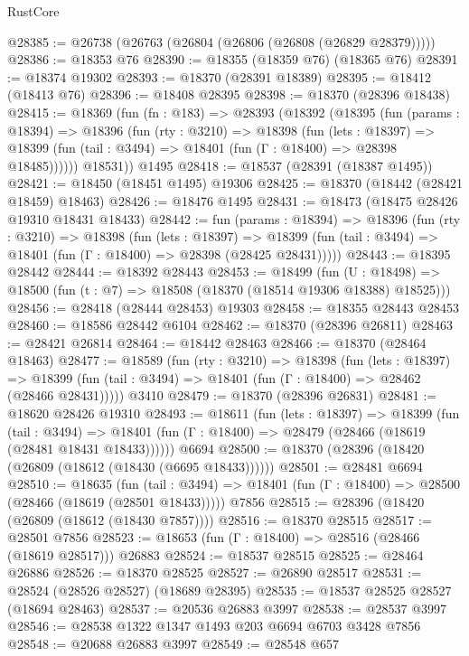 \begin{lexlean}{RustCore}
\begin{coremodule}
@28385 := @26738 (@26763 (@26804 (@26806 (@26808 (@26829 @28379)))))
@28386 := @18353 @76
@28390 := @18355 (@18359 @76) (@18365 @76)
@28391 := @18374 @19302
@28393 := @18370 (@28391 @18389)
@28395 := @18412 (@18413 @76)
@28396 := @18408 @28395
@28398 := @18370 (@28396 @18438)
@28415 := @18369
    (fun (fn : @183) =>
    @28393
      (@18392
        (@18395
          (fun (params : @18394) =>
          @18396
            (fun (rty : @3210) =>
            @18398
              (fun (lets : @18397) =>
              @18399 (fun (tail : @3494) => @18401 (fun (Γ : @18400) => @28398 @18485))))))
        @18531))
    @1495
@28418 := @18537 (@28391 (@18387 @1495))
@28421 := @18450 (@18451 @1495) @19306
@28425 := @18370 (@18442 (@28421 @18459) @18463)
@28426 := @18476 @1495
@28431 := @18473 (@18475 @28426 @19310 @18431 @18433)
@28442 := fun (params : @18394) =>
  @18396
    (fun (rty : @3210) =>
    @18398
      (fun (lets : @18397) =>
      @18399 (fun (tail : @3494) => @18401 (fun (Γ : @18400) => @28398 (@28425 @28431)))))
@28443 := @18395 @28442
@28444 := @18392 @28443
@28453 := @18499
    (fun (U : @18498) => @18500 (fun (t : @7) => @18508 (@18370 (@18514 @19306 @18388) @18525)))
@28456 := @28418 (@28444 @28453) @19303
@28458 := @18355 @28443 @28453
@28460 := @18586 @28442 @6104
@28462 := @18370 (@28396 @26811)
@28463 := @28421 @26814
@28464 := @18442 @28463
@28466 := @18370 (@28464 @18463)
@28477 := @18589
    (fun (rty : @3210) =>
    @18398
      (fun (lets : @18397) =>
      @18399 (fun (tail : @3494) => @18401 (fun (Γ : @18400) => @28462 (@28466 @28431)))))
    @3410
@28479 := @18370 (@28396 @26831)
@28481 := @18620 @28426 @19310
@28493 := @18611
    (fun (lets : @18397) =>
    @18399
      (fun (tail : @3494) =>
      @18401 (fun (Γ : @18400) => @28479 (@28466 (@18619 (@28481 @18431 @18433))))))
    @6694
@28500 := @18370 (@28396 (@18420 (@26809 (@18612 (@18430 (@6695 @18433))))))
@28501 := @28481 @6694
@28510 := @18635
    (fun (tail : @3494) => @18401 (fun (Γ : @18400) => @28500 (@28466 (@18619 (@28501 @18433)))))
    @7856
@28515 := @28396 (@18420 (@26809 (@18612 (@18430 @7857))))
@28516 := @18370 @28515
@28517 := @28501 @7856
@28523 := @18653 (fun (Γ : @18400) => @28516 (@28466 (@18619 @28517))) @26883
@28524 := @18537 @28515
@28525 := @28464 @26886
@28526 := @18370 @28525
@28527 := @26890 @28517
@28531 := @28524 (@28526 @28527) (@18689 @28395)
@28535 := @18537 @28525 @28527 (@18694 @28463)
@28537 := @20536 @26883 @3997
@28538 := @28537 @3997
@28546 := @28538 @1322 @1347 @1493 @203 @6694 @6703 @3428 @7856
@28548 := @20688 @26883 @3997
@28549 := @28548 @657

\end{coremodule}
\end{lexlean}

